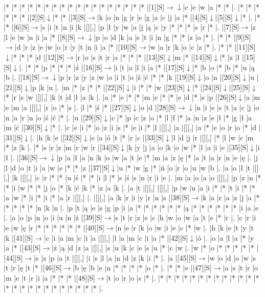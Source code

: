 \documentclass[11pt]{article}
\newcommand\drarr{$\rightarrow \!\!\!\!\! \downarrow$}
\newcommand\rarr{$\rightarrow$}
\newcommand\darr{$\downarrow$}
\begin{document}
\noindent\begin{Puzzle}{24}{29}|*	|*	|*	|*	|*	|*	|*	|*	|*	|*	|*	|*	|*	|*	|*	|*	|*	|*	|[1][S]\drarr	|c	|e	|w	|a	|*	|*	|.
|*	|*	|*	|*	|*	|*	|[2][S]\darr	|*	|*	|[3][S]\rarr	|k	|o	|n	|g	|r	|e	|g	|a	|c	|j	|a	|*	|[4][S]\darr	|[5][S]\darr	|*	|.
|*	|*	|[6][S]\rarr	|s	|i	|t	|n	|i	|k	|[][,]{ }	|p	|ł	|y	|w	|a	|j	|ą	|c	|y	|*	|*	|*	|s	|r	|*	|.
|[7][S]\rarr	|z	|l	|e	|w	|n	|i	|a	|*	|[8][S]\drarr	|p	|o	|d	|k	|a	|s	|t	|i	|n	|g	|*	|*	|z	|o	|*	|.
|*	|*	|[9][S]\rarr	|d	|r	|z	|e	|w	|o	|r	|y	|t	|n	|i	|a	|*	|[10][S]\rarr	|w	|a	|r	|k	|o	|c	|z	|*	|.
|*	|*	|[11][S]\darr	|*	|*	|*	|d	|[12][S]\rarr	|r	|o	|s	|t	|r	|a	|*	|*	|*	|[13][S]\darr	|m	|*	|[14][S]\darr	|*	|z	|ł	|[15][S]\darr	|.
|*	|*	|p	|*	|*	|*	|ź	|[16][S]\rarr	|i	|t	|a	|l	|i	|a	|*	|[17][S]\darr	|*	|b	|o	|*	|b	|*	|u	|ą	|b	|.
|[18][S]\drarr	|p	|r	|z	|y	|z	|w	|o	|i	|t	|o	|ś	|ć	|*	|*	|k	|[19][S]\darr	|o	|n	|[20][S]\darr	|u	|[21][S]\darr	|p	|k	|u	|.
|m	|*	|z	|*	|*	|[22][S]\darr	|i	|*	|*	|w	|[23][S]\darr	|*	|[24][S]\darr	|[25][S]\darr	|*	|r	|s	|w	|[][,]{ }	|k	|t	|d	|ł	|a	|k	|.
|a	|*	|e	|*	|*	|m	|e	|*	|*	|e	|d	|*	|s	|p	|[26][S]\darr	|a	|m	|e	|m	|a	|[][,]{ }	|r	|o	|*	|s	|.
|l	|*	|ś	|*	|[27][S]\darr	|o	|d	|[28][S]\drarr	|n	|i	|e	|s	|t	|a	|c	|j	|o	|n	|a	|r	|n	|o	|ś	|ć	|*	|.
|u	|[29][S]\darr	|c	|*	|p	|c	|z	|o	|*	|l	|f	|*	|a	|n	|z	|e	|ł	|*	|g	|ł	|a	|m	|ć	|[30][S]\darr	|*	|.
|c	|e	|i	|*	|o	|z	|i	|s	|*	|e	|i	|*	|l	|[][,]{ }	|a	|[][,]{ }	|a	|*	|e	|o	|r	|o	|*	|d	|[31][S]\darr	|.
|h	|k	|e	|[32][S]\darr	|e	|a	|ó	|t	|*	|r	|c	|[33][S]\darr	|l	|d	|j	|r	|[][,]{ }	|*	|l	|w	|c	|m	|*	|z	|k	|.
|*	|s	|r	|z	|m	|r	|w	|r	|[34][S]\darr	|k	|y	|j	|a	|o	|k	|o	|w	|*	|l	|a	|i	|e	|[35][S]\darr	|i	|ł	|.
|[36][S]\drarr	|p	|a	|ł	|a	|n	|k	|o	|w	|a	|t	|e	|*	|m	|a	|z	|ę	|*	|a	|t	|a	|r	|n	|e	|ę	|.
|j	|l	|d	|o	|t	|i	|a	|w	|e	|*	|*	|z	|[37][S]\darr	|u	|*	|w	|g	|*	|ń	|o	|r	|o	|u	|w	|b	|.
|a	|o	|ł	|t	|[][,]{ }	|k	|[][,]{ }	|c	|r	|*	|*	|u	|ś	|*	|*	|i	|l	|*	|s	|ś	|s	|n	|r	|i	|e	|.
|m	|a	|o	|a	|o	|[][,]{ }	|p	|z	|n	|*	|*	|i	|w	|*	|*	|j	|o	|*	|k	|ć	|k	|*	|z	|a	|k	|.
|a	|t	|[][,]{ }	|[][,]{ }	|p	|w	|u	|a	|i	|*	|*	|t	|i	|*	|*	|a	|w	|*	|i	|*	|i	|*	|a	|r	|[][,]{ }	|.
|[][,]{ }	|a	|k	|r	|i	|y	|r	|n	|s	|[38][S]\rarr	|k	|a	|r	|a	|z	|j	|a	|*	|*	|*	|*	|*	|n	|k	|n	|.
|p	|t	|ą	|e	|s	|g	|p	|i	|a	|*	|*	|*	|*	|*	|*	|ą	|*	|*	|*	|*	|*	|*	|i	|a	|e	|.
|a	|o	|p	|n	|o	|i	|u	|n	|ż	|[39][S]\rarr	|s	|t	|r	|z	|e	|c	|h	|w	|o	|w	|a	|t	|e	|*	|r	|.
|c	|r	|i	|e	|w	|ę	|r	|*	|*	|*	|*	|*	|*	|[40][S]\rarr	|n	|e	|r	|k	|o	|w	|i	|e	|c	|*	|w	|.
|h	|k	|e	|t	|y	|t	|k	|[41][S]\rarr	|c	|i	|a	|m	|c	|i	|a	|[][,]{ }	|l	|a	|m	|c	|i	|a	|*	|[42][S]\darr	|ó	|.
|o	|a	|l	|a	|*	|y	|a	|*	|[43][S]\rarr	|ż	|ą	|d	|z	|a	|[][,]{ }	|s	|u	|k	|c	|e	|s	|u	|*	|c	|w	|.
|w	|*	|o	|*	|*	|*	|*	|*	|[44][S]\rarr	|s	|z	|p	|a	|t	|[][,]{ }	|i	|s	|l	|a	|n	|d	|z	|k	|i	|*	|.
|a	|[45][S]\rarr	|w	|o	|d	|o	|w	|s	|t	|r	|ę	|t	|*	|[46][S]\rarr	|b	|ę	|b	|e	|n	|*	|*	|*	|*	|o	|*	|.
|*	|*	|e	|[47][S]\rarr	|a	|s	|t	|r	|o	|m	|e	|t	|r	|i	|a	|*	|*	|*	|[48][S]\rarr	|t	|o	|r	|o	|s	|*	|.
|*	|*	|*	|*	|*	|*	|*	|*	|*	|*	|*	|*	|*	|*	|*	|*	|*	|*	|*	|*	|*	|*	|*	|*	|*	|.\end{Puzzle}
\end{document}
